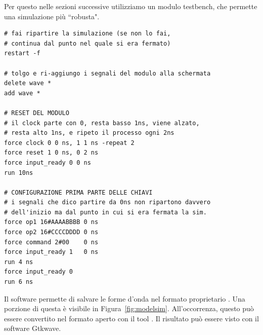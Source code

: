 Per questo nelle sezioni successive utilizziamo un modulo testbench, che permette una simulazione più ``robusta". 

\begin{verbatim}
# fai ripartire la simulazione (se non lo fai, 
# continua dal punto nel quale si era fermato)
restart -f 

# tolgo e ri-aggiungo i segnali del modulo alla schermata
delete wave *
add wave *

# RESET DEL MODULO
# il clock parte con 0, resta basso 1ns, viene alzato, 
# resta alto 1ns, e ripeto il processo ogni 2ns
force clock 0 0 ns, 1 1 ns -repeat 2
force reset 1 0 ns, 0 2 ns
force input_ready 0 0 ns
run 10ns

# CONFIGURAZIONE PRIMA PARTE DELLE CHIAVI
# i segnali che dico partire da 0ns non ripartono davvero
# dell'inizio ma dal punto in cui si era fermata la sim.
force op1 16#AAAABBBB 0 ns
force op2 16#CCCCDDDD 0 ns
force command 2#00    0 ns
force input_ready 1   0 ns
run 4 ns
force input_ready 0   
run 6 ns
\end{verbatim}

Il software permette di salvare le forme d'onda nel formato proprietario . Una porzione di questa è visibile in Figura~\ref{fig:modelsim}. All'occorrenza, questo può essere convertito nel formato aperto  con il tool . Il risultato può essere visto con il software \textsf{Gtkwave}. 

